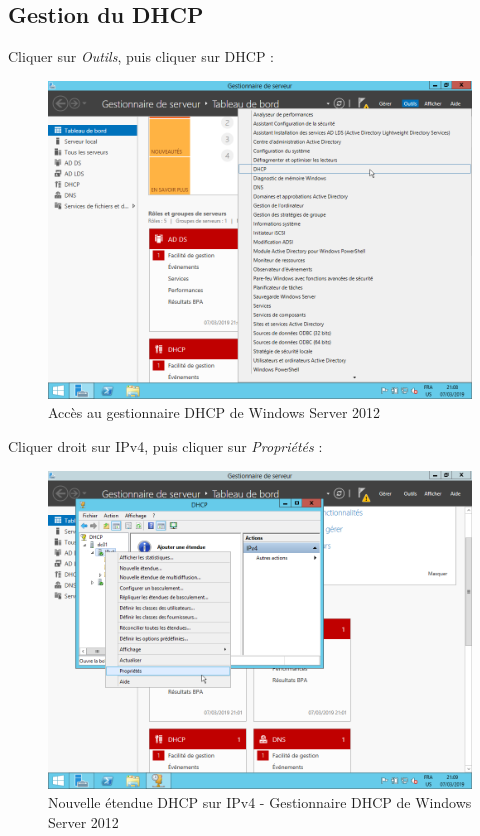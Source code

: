 \newpage
\subsection{Gestion du DHCP}

Cliquer sur \textit{Outils}, puis cliquer sur DHCP :
\begin{figure}[h!]
    \begin{center}
        \includegraphics[scale=0.6]{WS2012_Screenshots/40.png}
        \caption{Accès au gestionnaire DHCP de Windows Server 2012}
        \label{WS2012_Screenshots/40}
    \end{center}
\end{figure}
\FloatBarrier

\newpage
Cliquer droit sur IPv4, puis cliquer sur \textit{Propriétés} :
\begin{figure}[h!]
    \begin{center}
        \includegraphics[scale=0.6]{WS2012_Screenshots/41.png}
        \caption{Nouvelle étendue DHCP sur IPv4 - Gestionnaire DHCP de Windows Server 2012}
        \label{WS2012_Screenshots/41}
    \end{center}
\end{figure}
\FloatBarrier

